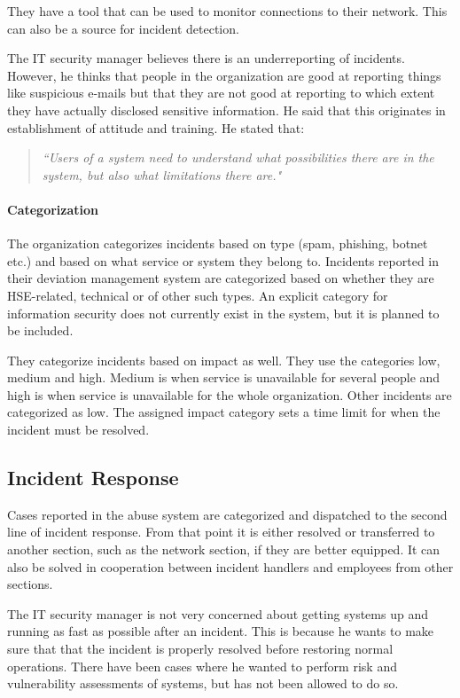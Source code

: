 They have a tool that can be used to monitor connections to their network. This can also be a source for incident detection.

The IT security manager believes there is an underreporting of incidents. However, he thinks that people in the organization are good at reporting things like suspicious e-mails but that they are not good at reporting to which extent they have actually disclosed sensitive information. He said that this originates in establishment of attitude and training. He stated that:

\begin{quote}
\textit{``Users of a system need to understand what possibilities there are in the system, but also what limitations there are."} 
\end{quote}

\paragraph{Categorization}
The organization categorizes incidents based on type (spam, phishing, botnet etc.) and based on what service or system they belong to. Incidents reported in their deviation management system are categorized based on whether they are \ac{HSE}-related, technical or of other such types. An explicit category for information security does not currently exist in the system, but it is planned to be included.

They categorize incidents based on impact as well. They use the categories low, medium and high. Medium is when service is unavailable for several people and high is when service is unavailable for the whole organization. Other incidents are categorized as low. The assigned impact category sets a time limit for when the incident must be resolved.

\subsection{Incident Response}
Cases reported in the abuse system are categorized and dispatched to the second line of incident response. %
From that point it is either resolved or transferred to another section, such as the network section, if they are better equipped. It can also be solved in cooperation between incident handlers and employees from other sections.

The IT security manager is not very concerned about getting systems up and running as fast as possible after an incident. This is because he wants to make sure that that the incident is properly resolved before restoring normal operations. There have been cases where he wanted to perform risk and vulnerability assessments of systems, but has not been allowed to do so.

